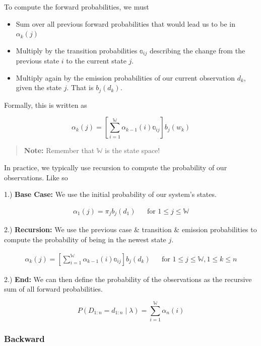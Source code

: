 \documentclass[
]{book}
\providecommand{\tightlist}{%
  \setlength{\itemsep}{0pt}\setlength{\parskip}{0pt}}
\begin{document}
To compute the forward probabilities, we must

\begin{itemize}
\tightlist
\item
  Sum over all previous forward probabilities that would lead us to be in \(\alpha_k(j)\)
\item
  Multiply by the transition probabilities \(\mathbb{a}_{ij}\) describing the change from the previous state \(i\) to the current state \(j\).
\item
  Multiply again by the emission probabilities of our current observation \(d_k\), given the state \(j\). That is \(b_j(d_{k})\).
\end{itemize}

Formally, this is written as

\[\alpha_{k}(j) = \left[\sum_{i=1}^\mathbb{W} \alpha_{k-1}(i) \mathbb{a}_{ij} \right]b_j(w_{k})\]

\begin{quote}
\textbf{Note:} Remember that \(\mathbb{W}\) is the state space!
\end{quote}

\hfill\break

In practice, we typically use recursion to compute the probability of our observations. Like so

1.) \textbf{Base Case:} We use the initial probability of our system's states.

\begin{align*}
\alpha_1(j) = \pi_jb_j(d_1) && \text{for } 1 \leq j \leq \mathbb{W}
\end{align*}

2.) \textbf{Recursion:} We use the previous case \& transition \& emission probabilities to compute the probability of being in the newest state \(j\).

\begin{align*}
\alpha_{k}(j) = \left[\sum_{i=1}^\mathbb{W} \alpha_{k-1}(i) \mathbb{a}_{ij} \right]b_j(d_{k}) && \text{for } 1 \leq j \leq \mathbb{W}, 1 \leq k \leq n
\end{align*}

2.) \textbf{End:} We can then define the probability of the observations as the recursive sum of all forward probabilities.

\[P(D_{1:n} = d_{1:n} \mid \lambda) = \sum_{i=1}^\mathbb{W} \alpha_{n}(i)\]

\hypertarget{backward}{%
\subsubsection*{Backward}\label{backward}}
\end{document}
